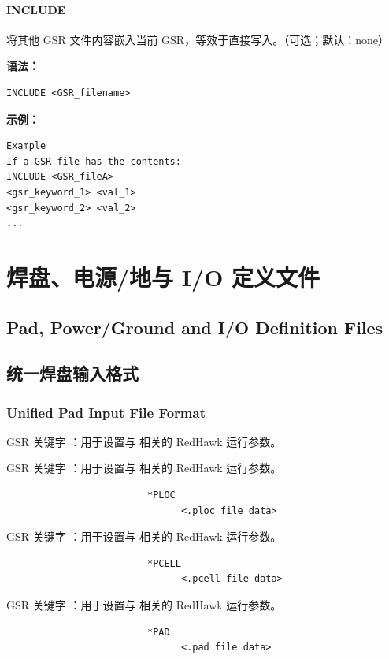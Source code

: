 \paragraph*{INCLUDE}

将其他 GSR 文件内容嵌入当前 GSR，等效于直接写入。（可选；默认：none）

\textbf{语法：}
\begin{lstlisting}
INCLUDE <GSR_filename>
\end{lstlisting}

\textbf{示例：}
\begin{lstlisting}
Example
If a GSR file has the contents:
INCLUDE <GSR_fileA>
<gsr_keyword_1> <val_1>
<gsr_keyword_2> <val_2>
...
\end{lstlisting}

\section{焊盘、电源/地与 I/O 定义文件}
\subsection*{Pad, Power/Ground and I/O Definition Files}

\subsection{统一焊盘输入格式}
\subsubsection*{Unified Pad Input File Format}

GSR 关键字 ：用于设置与  相关的 RedHawk 运行参数。

GSR 关键字 ：用于设置与  相关的 RedHawk 运行参数。

\begin{lstlisting}
                         *PLOC
                               <.ploc file data>
\end{lstlisting}

GSR 关键字 ：用于设置与  相关的 RedHawk 运行参数。

\begin{lstlisting}
                         *PCELL
                               <.pcell file data>
\end{lstlisting}

GSR 关键字 ：用于设置与  相关的 RedHawk 运行参数。

\begin{lstlisting}
                         *PAD
                               <.pad file data>
\end{lstlisting}

